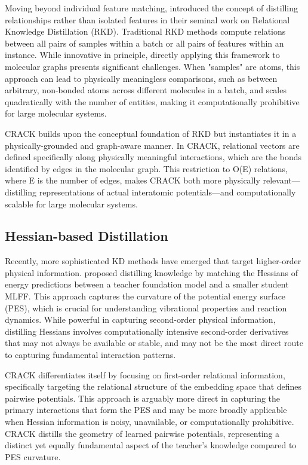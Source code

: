\documentclass{article}
\begin{document}
Moving beyond individual feature matching, \citet{park2019relational} introduced the concept of distilling relationships rather than isolated features in their seminal work on Relational Knowledge Distillation (RKD). 
Traditional RKD methods compute relations between all pairs of samples within a batch or all pairs of features within an instance. 
While innovative in principle, directly applying this framework to molecular graphs presents significant challenges. 
When "samples" are atoms, this approach can lead to physically meaningless comparisons, such as between arbitrary, non-bonded atoms across different molecules in a batch, and scales quadratically with the number of entities, making it computationally prohibitive for large molecular systems.

CRACK builds upon the conceptual foundation of RKD but instantiates it in a physically-grounded and graph-aware manner. In CRACK, relational vectors are defined specifically along physically meaningful interactions, which are the bonds identified by edges in the molecular graph. 
This restriction to O(E) relations, where E is the number of edges, makes CRACK both more physically relevant—distilling representations of actual interatomic potentials—and computationally scalable for large molecular systems.


\subsection{Hessian-based Distillation}

Recently, more sophisticated KD methods have emerged that target higher-order physical information. 
\citet{amin2025towards} proposed distilling knowledge by matching the Hessians of energy predictions between a teacher foundation model and a smaller student MLFF. 
This approach captures the curvature of the potential energy surface (PES), which is crucial for understanding vibrational properties and reaction dynamics. 
While powerful in capturing second-order physical information, distilling Hessians involves computationally intensive second-order derivatives that may not always be available or stable, and may not be the most direct route to capturing fundamental interaction patterns.

CRACK differentiates itself by focusing on first-order relational information, specifically targeting the relational structure of the embedding space that defines pairwise potentials. 
This approach is arguably more direct in capturing the primary interactions that form the PES and may be more broadly applicable when Hessian information is noisy, unavailable, or computationally prohibitive. 
CRACK distills the geometry of learned pairwise potentials, representing a distinct yet equally fundamental aspect of the teacher's knowledge compared to PES curvature.
\end{document}
